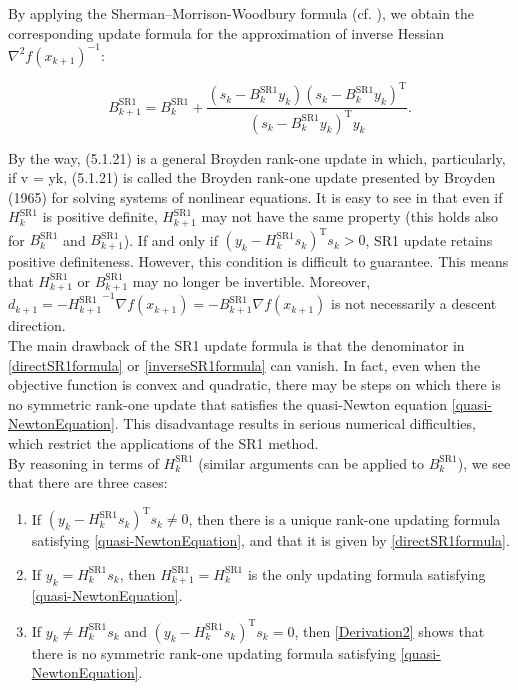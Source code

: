 By applying the Sherman–Morrison-Woodbury formula (cf. ), we obtain the corresponding update formula for the approximation of inverse Hessian ${\nabla^{2} f(x_{k+1})}^{-1}$:

\begin{equation}\label{inverseSR1formula}
    B^\mathrm{SR1}_{k+1} = B^\mathrm{SR1}_k + \frac{(s_k - B^\mathrm{SR1}_k y_k) (s_k - B^\mathrm{SR1}_k y_k)^{\mathrm{T}}}{(s_k - B^\mathrm{SR1}_k y_k)^{\mathrm{T}} y_k}.
\end{equation}


By the way, (5.1.21) is a general Broyden rank-one update in which, particularly, if v = yk, (5.1.21) is called the Broyden rank-one update presented
by Broyden (1965) for solving systems of nonlinear equations.
It is easy to see in that even if $H^\mathrm{SR1}_k$ is positive definite, $H^\mathrm{SR1}_{k+1}$ may not have the same property (this holds also for $B^\mathrm{SR1}_k$ and $B^\mathrm{SR1}_{k+1}$). If and only if $(y_k - H^\mathrm{SR1}_k s_k)^{\mathrm{T}} s_k > 0$, SR1 update retains positive definiteness. However, this condition is difficult to guarantee. This means that $H^\mathrm{SR1}_{k+1}$ or $B^\mathrm{SR1}_{k+1}$ may no longer be invertible. Moreover, $d_{k+1} = -{H^\mathrm{SR1}_{k+1}}^{-1} \nabla f(x_{k+1}) = -B^\mathrm{SR1}_{k+1} \nabla f(x_{k+1})$ is not necessarily a descent direction. \\
The main drawback of the SR1 update formula is that the denominator in \cref{directSR1formula} or \cref{inverseSR1formula} can vanish. In fact, even when the objective function is convex and quadratic, there may be steps on which there is no symmetric rank-one update that satisfies the quasi-Newton equation \cref{quasi-NewtonEquation}. This disadvantage results in serious numerical difficulties, which restrict the applications of the SR1 method. \\ 
By reasoning in terms of $H^\mathrm{SR1}_k$ (similar arguments can be applied to $B^\mathrm{SR1}_k$), we see that there are three cases:

\begin{enumerate}
    \item If $(y_k - H^\mathrm{SR1}_k s_k)^{\mathrm{T}} s_k \neq 0$, then there is a unique rank-one updating formula satisfying \cref{quasi-NewtonEquation}, and that it is given by \cref{directSR1formula}.
    \item If $y_k = H^\mathrm{SR1}_k s_k$, then $H^\mathrm{SR1}_{k+1} = H^\mathrm{SR1}_k$ is the only updating formula satisfying \cref{quasi-NewtonEquation}.
    \item If $y_k \neq H^\mathrm{SR1}_k s_k$ and $(y_k - H^\mathrm{SR1}_k s_k)^{\mathrm{T}} s_k = 0$, then \cref{Derivation2} shows that there is no symmetric rank-one updating formula satisfying \cref{quasi-NewtonEquation}.
\end{enumerate}


